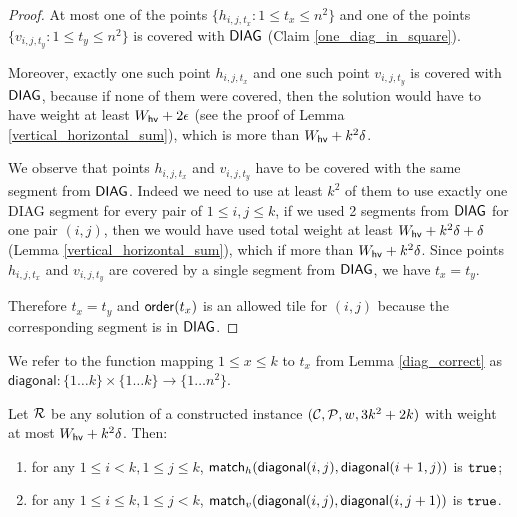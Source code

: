 \begin{proof}
At most one of the points $\{h_{i,j,t_x} : 1 \le t_x \le n^2\}$
and one of the points $\{v_{i,j,t_y} : 1 \le t_y \le n^2\}$
is covered with $\mathsf{DIAG}$
(Claim \ref{one_diag_in_square}).
	
Moreover, exactly one such point $h_{i,j,t_x}$ and one such point $v_{i,j,t_y}$
is covered with $\mathsf{DIAG}$,
because if none of them were covered, then the solution would have to
have weight at least $W_{\mathsf{hv}} + 2\epsilon$ (see the proof of Lemma \ref{vertical_horizontal_sum}),
which is more than $W_{\mathsf{hv}}+k^2\delta$.

We observe that points $h_{i,j,t_x}$ and $v_{i,j,t_y}$
have to be covered with the same segment from $\mathsf{DIAG}$.
Indeed we need to use at least $k^2$ of them to use
exactly one DIAG segment for every pair of $1 \le i,j \le k$,
if we used 2 segments from $\mathsf{DIAG}$
for one pair $(i,j)$,
then we would have used total weight at least
$W_{\mathsf{hv}} + k^2\delta + \delta$ (Lemma \ref{vertical_horizontal_sum}),
which if more than $W_{\mathsf{hv}}+k^2\delta$.
Since points $h_{i,j,t_x}$ and $v_{i,j,t_y}$ are covered by
a single segment from $\mathsf{DIAG}$, we have $t_x = t_y$.

Therefore $t_x = t_y$
and $\mathsf{order}(t_x)$ is an allowed tile for $(i,j)$
because the corresponding segment is in $\mathsf{DIAG}$.
\end{proof}

\newcommand{\diagonal}{\mathsf{diagonal}}
We refer to the function mapping $1 \le x \le k$ to $t_x$ from Lemma \ref{diag_correct}
as $\diagonal : \{1 \ldots k\} \times \{1 \ldots k\} \rightarrow \{1 \ldots n^2\}$.

\begin{lemma}
\label{vertical_horizontal_synchronized}
Let $\mathcal{R}$ be any solution
of a constructed instance $(\mathcal{C}, \mathcal{P}, w, 3k^2+2k)$
with weight at most $W_{\mathsf{hv}}+k^2\delta$. Then:
\begin{enumerate}
\item 
for any $1 \le i < k, 1 \le j \le k$,
$\matchh(\diagonal(i, j),\diagonal(i+1, j))$ is $\texttt{true}$;
\item 
for any $1 \le i \le k, 1 \le j < k$,
$\matchv(\diagonal(i, j),\diagonal(i, j+1))$ is $\texttt{true}$.
\end{enumerate}
\end{lemma}

